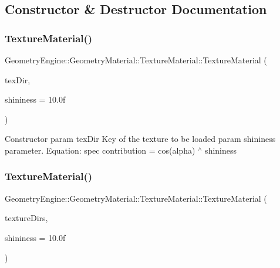\subsection{Constructor \& Destructor Documentation}
\mbox{\label{class_geometry_engine_1_1_geometry_material_1_1_texture_material_a90a61577a2d5b13b91809bcaea97dae7}} 
\subsubsection{\texorpdfstring{TextureMaterial()}{TextureMaterial()}\hspace{0.1cm}{\footnotesize\ttfamily [1/3]}}
{\footnotesize\ttfamily Geometry\+Engine\+::\+Geometry\+Material\+::\+Texture\+Material\+::\+Texture\+Material (\begin{DoxyParamCaption}\item[{const std\+::string \&}]{tex\+Dir,  }\item[{float}]{shininess = {\ttfamily 10.0f} }\end{DoxyParamCaption})}

Constructor param tex\+Dir Key of the texture to be loaded param shininess parameter. Equation\+: spec contribution = cos(alpha) $^\wedge$ shininess \mbox{\label{class_geometry_engine_1_1_geometry_material_1_1_texture_material_af6c96a0f976b0ed3d558d7d395ec35b2}} 
\subsubsection{\texorpdfstring{TextureMaterial()}{TextureMaterial()}\hspace{0.1cm}{\footnotesize\ttfamily [2/3]}}
{\footnotesize\ttfamily Geometry\+Engine\+::\+Geometry\+Material\+::\+Texture\+Material\+::\+Texture\+Material (\begin{DoxyParamCaption}\item[{const std\+::list$<$ \mbox{\hyperlink{class_geometry_engine_1_1_geometry_material_1_1_texture_parameters}{Texture\+Parameters}} $\ast$ $>$ \&}]{texture\+Dirs,  }\item[{float}]{shininess = {\ttfamily 10.0f} }\end{DoxyParamCaption})}

